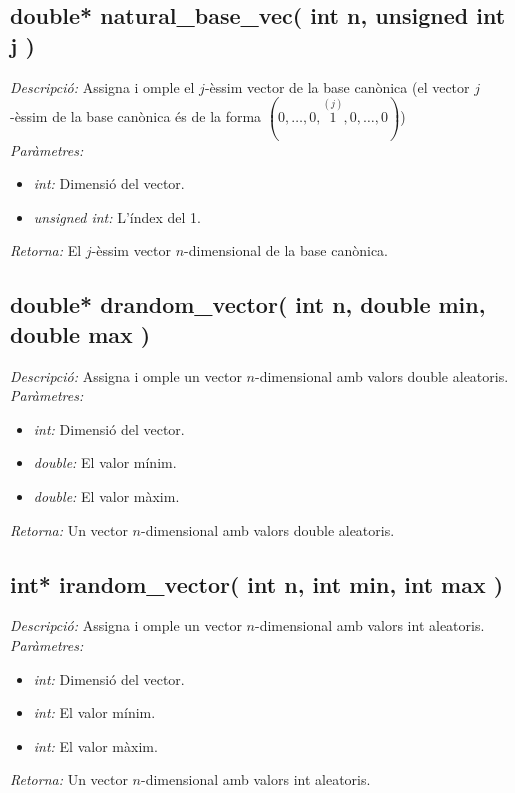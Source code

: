 \documentclass[a4paper,10pt, notitlepage]{article}
\begin{document}
\subsection{double* natural\_base\_vec( int n, unsigned int j )}
\textit{Descripció: }
  Assigna i omple el $j$-èssim vector de la base canònica (el vector $j$-èssim de la base canònica és de la forma $(0,\dots,0,\stackrel{(j)}{1}, 0, \dots, 0)$)
\\\textit{Paràmetres: }\begin{itemize}[label={--}]
  \item \textit{int: } Dimensió del vector.
  \item \textit{unsigned int: } L'índex del 1.
\end{itemize}
\textit{Retorna: } El $j$-èssim vector $n$-dimensional de la base canònica.



\subsection{double* drandom\_vector( int n, double min, double max )}
\textit{Descripció: }
  Assigna i omple un vector $n$-dimensional amb valors double aleatoris.
\\\textit{Paràmetres: }\begin{itemize}[label={--}]
  \item \textit{int: } Dimensió del vector.
  \item \textit{double: } El valor mínim.
  \item \textit{double: } El valor màxim.
\end{itemize}
\textit{Retorna: } Un vector $n$-dimensional amb valors double aleatoris.



\subsection{int* irandom\_vector( int n, int min, int max )}
\textit{Descripció: }
  Assigna i omple un vector $n$-dimensional amb valors int aleatoris.
\\\textit{Paràmetres: }\begin{itemize}[label={--}]
  \item \textit{int: } Dimensió del vector.
  \item \textit{int: } El valor mínim.
  \item \textit{int: } El valor màxim.
\end{itemize}
\textit{Retorna: } Un vector $n$-dimensional amb valors int aleatoris.
\end{document}
